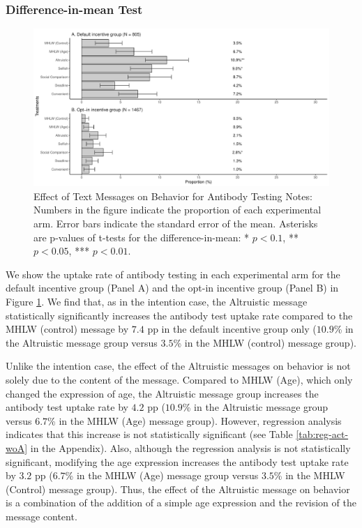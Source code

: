 \documentclass[
]{article}
\begin{document}
\hypertarget{difference-in-mean-test-1}{%
\subsubsection{Difference-in-mean Test}\label{difference-in-mean-test-1}}

\begin{figure}
\centering
\includegraphics{discussion-paper_files/figure-latex/ttest-act-test-1.pdf}
\caption{\label{fig:ttest-act-test}Effect of Text Messages on Behavior for Antibody Testing Notes: Numbers in the figure indicate the proportion of each experimental arm. Error bars indicate the standard error of the mean. Asterisks are p-values of t-tests for the difference-in-mean: * \(p < 0.1\), ** \(p < 0.05\), *** \(p < 0.01\).}
\end{figure}

We show the uptake rate of antibody testing in each experimental arm for the default incentive group (Panel A) and the opt-in incentive group (Panel B) in Figure \ref{fig:ttest-act-test}. We find that, as in the intention case, the Altruistic message statistically significantly increases the antibody test uptake rate compared to the MHLW (control) message by \(7.4\) pp in the default incentive group only (\(10.9\)\% in the Altruistic message group versus \(3.5\)\% in the MHLW (control) message group).

Unlike the intention case, the effect of the Altruistic messages on behavior is not solely due to the content of the message. Compared to MHLW (Age), which only changed the expression of age, the Altruistic message group increases the antibody test uptake rate by \(4.2\) pp (\(10.9\)\% in the Altruistic message group versus \(6.7\)\% in the MHLW (Age) message group). However, regression analysis indicates that this increase is not statistically significant (see Table \ref{tab:reg-act-woA} in the Appendix). Also, although the regression analysis is not statistically significant, modifying the age expression increases the antibody test uptake rate by \(3.2\) pp (\(6.7\)\% in the MHLW (Age) message group versus \(3.5\)\% in the MHLW (Control) message group). Thus, the effect of the Altruistic message on behavior is a combination of the addition of a simple age expression and the revision of the message content.
\end{document}
